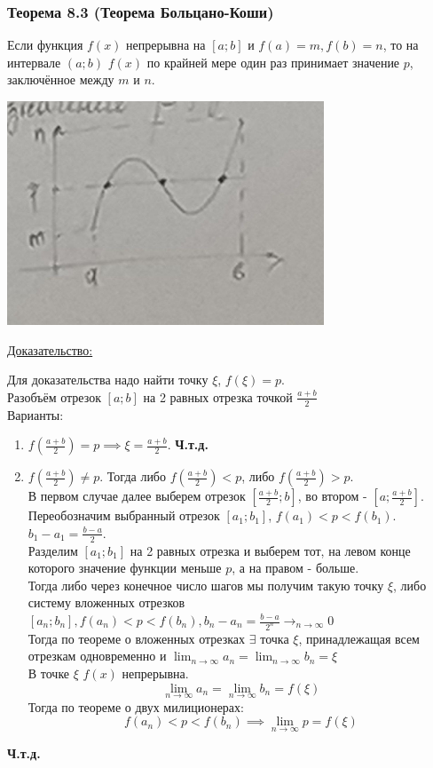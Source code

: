 \documentclass[12pt]{article}
\begin{document}
    \subsubsection*{Теорема 8.3 (Теорема Больцано-Коши)}
    Если функция $f(x)$ непрерывна на $[a; b]$ и $f(a) = m, f(b) = n$, то на интервале $(a; b)$ $f(x)$ по крайней мере один раз принимает значение $p$, заключённое между $m$ и $n$.
    \begin{center}
        \includegraphics{3.8.1}
    \end{center}
    \underline{Доказательство:}
    \begin{adjustwidth}{1.5em}{1.5em}
        Для доказательства надо найти точку $\xi$, $f(\xi) = p$.\\
        Разобъём отрезок $[a; b]$ на 2 равных отрезка точкой $\frac{a + b}{2}$\\
        Варианты:
        \begin{enumerate}
            \item $f(\frac{a+b}{2}) = p \implies \xi = \frac{a+b}{2}$. \textbf{Ч.т.д.}
            \item $f(\frac{a+b}{2}) \ne p$. Тогда либо $f(\frac{a+b}{2}) < p$, либо $f(\frac{a+b}{2}) > p$.\\
            В первом случае далее выберем отрезок $[\frac{a+b}{2}; b]$, во втором - $[a; \frac{a+b}{2}]$. Переобозначим выбранный отрезок $[a_1; b_1]$, $f(a_1) < p < f(b_1)$. $b_1 - a_1 = \frac{b-a}{2}$.\\
            Разделим $[a_1; b_1]$ на 2 равных отрезка и выберем тот, на левом конце которого значение функции меньше $p$, а на правом - больше.\\
            Тогда либо через конечное число шагов мы получим такую точку $\xi$, либо систему вложенных отрезков $[a_n; b_n], f(a_n) < p < f(b_n), b_n - a_n = \frac{b-a}{2^n} \to_{n \to \infty} 0$\\
            Тогда по теореме о вложенных отрезках $\exists$ точка $\xi$, принадлежащая всем отрезкам одновременно и $\lim_{n\to\infty}a_n = \lim_{n\to\infty} b_n = \xi$\\
            В точке $\xi$ $f(x)$ непрерывна.
            \[ \lim_{n\to\infty}a_n = \lim_{n\to\infty}b_n = f(\xi) \]
            Тогда по теореме о двух милиционерах:
            \[ f(a_n) < p < f(b_n) \implies \lim_{n\to\infty}p = f(\xi) \]
        \end{enumerate}
        \begin{center}
            \textbf{Ч.т.д.}
        \end{center}
    \end{adjustwidth}
\end{document}

